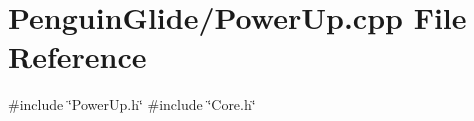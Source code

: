 \section{Penguin\+Glide/\+Power\+Up.cpp File Reference}
\label{_power_up_8cpp}
{\ttfamily \#include \char`\"{}Power\+Up.\+h\char`\"{}}\newline
{\ttfamily \#include \char`\"{}Core.\+h\char`\"{}}\newline
